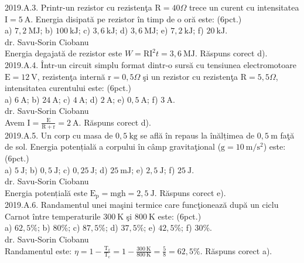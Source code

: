 2019.A.3. Printr-un rezistor cu rezistenţa $\mathrm{R}=40 \Omega$ trece un curent cu intensitatea $\mathrm{I}=5 \mathrm{~A}$. Energia disipată pe rezistor în timp de o oră este: (6pct.)\\ a) $7,2 \mathrm{~MJ}$; b) $100 \mathrm{~kJ}$; c) $3,6 \mathrm{~kJ}$; d) $3,6 \mathrm{~MJ}$; e) $7,2 \mathrm{~kJ}$; f) $20 \mathrm{~kJ}$.\\ dr. Savu-Sorin Ciobanu\\ Energia degajată de rezistor este $W=\mathrm{RI}^{2} t=3,6 \mathrm{~MJ}$. Răspuns corect d).\\

2019.A.4. Într-un circuit simplu format dintr-o sursă cu tensiunea electromotoare $\mathrm{E}=12 \mathrm{~V}$, rezistenţa internă $\mathrm{r}=0,5 \Omega$ şi un rezistor cu rezistenţa $\mathrm{R}=5,5 \Omega$, intensitatea curentului este: (6pct.)\\ a) $6 \mathrm{~A}$; b) $24 \mathrm{~A}$; c) $4 \mathrm{~A}$; d) $2 \mathrm{~A}$; e) $0,5 \mathrm{~A}$; f) $3 \mathrm{~A}$.\\ dr. Savu-Sorin Ciobanu\\ Avem $\mathrm{I}=\frac{\mathrm{E}}{\mathrm{R}+\mathrm{r}}=2 \mathrm{~A}$. Răspuns corect d).\\

2019.A.5. Un corp cu masa de $0,5 \mathrm{~kg}$ se află în repaus la înălțimea de $0,5 \mathrm{~m}$ faţă de sol. Energia potențială a corpului în câmp gravitaţional ($\mathrm{g}=10 \mathrm{~m} / \mathrm{s}^{2}$) este: (6pct.)\\ a) $5 \mathrm{~J}$; b) $0,5 \mathrm{~J}$; c) $0,25 \mathrm{~J}$; d) $25 \mathrm{~mJ}$; e) $2,5 \mathrm{~J}$; f) $25 \mathrm{~J}$.\\ dr. Savu-Sorin Ciobanu\\ Energia potențială este $\mathrm{E}_{\mathrm{p}}=\mathrm{mgh}=2,5 \mathrm{~J}$. Răspuns corect e).\\

2019.A.6. Randamentul unei maşini termice care funcţionează după un ciclu Carnot între temperaturile $300 \mathrm{~K}$ şi $800 \mathrm{~K}$ este: (6pct.)\\ a) $62,5 \%$; b) $80 \%$; c) $87,5 \%$; d) $37,5 \%$; e) $42,5 \%$; f) $30 \%$.\\ dr. Savu-Sorin Ciobanu\\ Randamentul este: $\eta=1-\frac{\mathrm{T}_{\mathrm{r}}}{\mathrm{T}_{\mathrm{c}}}=1-\frac{300 \mathrm{~K}}{800 \mathrm{~K}}=\frac{5}{8}=62,5 \%$. Răspuns corect a).\\

